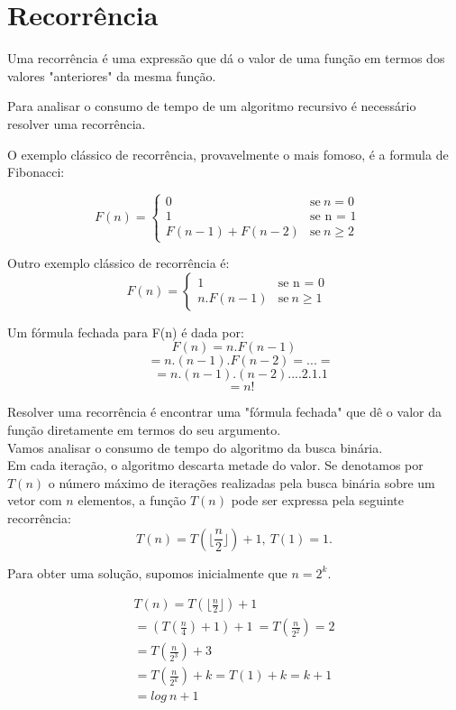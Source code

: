 \documentclass[]{article}
\begin{document}
\section{Recorrência}
Uma recorrência é uma expressão que dá o valor de uma função em termos dos valores "anteriores" da mesma função.

Para analisar o consumo de tempo de um algoritmo recursivo é necessário resolver uma recorrência.

O exemplo clássico de recorrência, provavelmente o mais fomoso, é a formula de Fibonacci:

$$
F(n) = \left\{
\begin{array}{ccc}
	0 &\mbox{se}\ n = 0\quad \\
	1 &\mbox{se n = 1}\quad \\
	F(n - 1) + F(n - 2) &\mbox{se} \ n \ge 2\quad
\end{array}\right.
$$

Outro exemplo clássico de recorrência é:
$$
F(n) = \left\{
\begin{array}{cc}
1 &\mbox{se n = 0}\quad \\
n.F(n - 1) &\mbox{se} \ n \ge 1\quad
\end{array}\right.
$$

Um fórmula fechada para F(n) é dada por:
$$F(n) = n.F(n - 1)$$
$$\quad = n.(n - 1).F(n - 2) = ... =$$
$$\quad = n.(n - 1).(n - 2).... 2.1.1$$
$$\quad = n!$$

Resolver uma recorrência é encontrar uma "fórmula fechada" que dê o valor da função diretamente em termos do seu argumento.
\\
Vamos analisar o consumo de tempo do algoritmo da busca binária.
\\
Em cada iteração, o algoritmo descarta metade do valor. Se denotamos por $T(n)$ o número máximo de iterações realizadas pela busca binária sobre um vetor com $n$ elementos, a função $T(n)$ pode ser expressa pela seguinte recorrência:
$$
T(n) = T(\lfloor \frac{n}{2} \rfloor) + 1, \ T(1) = 1.
$$

Para obter uma solução, supomos inicialmente que $n = 2^k$.


\begin{equation}
\begin{split}
T(n) = T(\lfloor \frac{n}{2} \rfloor) + 1 \\
= (T(\frac{n}{4}) + 1) + 1 \ = T(\frac{n}{2^2}) = 2\\
= T(\frac{n}{2^3}) + 3 \\
= T(\frac{n}{2^k}) + k = T(1) + k = k + 1 \\
= log \ {n} + 1
\end{split}
\end{equation}
\end{document}
